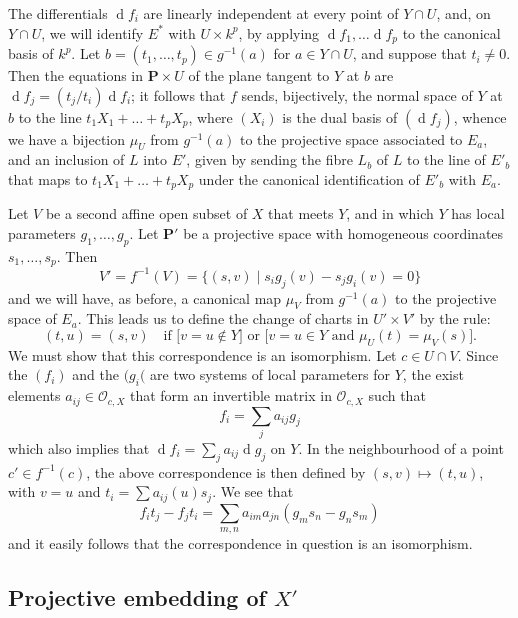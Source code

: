 \documentclass{article}
\theoremstyle{plain}
\theoremstyle{definition}
\newcommand{\scr}[1]{{\mathscr{#1}}}
\newcommand{\PP}{\mathbf{P}}
\newcommand{\dd}{\operatorname{d}\!}
\newcommand{\oldpage}[1]{\marginpar{\footnotesize$\Big\vert$ \textit{p.~#1}}}
\begin{document}
The differentials $\dd f_i$ are linearly independent at every point of $Y\cap U$, and, on $Y\cap U$, we will identify $E^*$ with $U\times k^p$, by applying $\dd f_1,\ldots\dd f_p$ to the canonical basis of $k^p$.
Let $b=(t_1,\ldots,t_p)\in g^{-1}(a)$ for $a\in Y\cap U$, and suppose that $t_i\neq 0$.
Then the equations in $\PP\times U$ of the plane tangent to $Y$ at $b$ are $\dd f_j=(t_j/t_i)\dd f_i$;
it follows that $f$ sends, bijectively, the normal space of $Y$ at $b$ to the line $t_1X_1+\ldots+t_pX_p$, where $(X_i)$ is the dual basis of $(\dd f_j)$, whence we have a bijection $\mu_U$ from $g^{-1}(a)$ to the projective space associated to $E_a$, and an inclusion of $L$ into $E'$, given by sending the fibre $L_b$ of $L$ to the line of $E'_b$ that maps to $t_1X_1+\ldots+t_pX_p$ under the canonical identification of $E'_b$ with $E_a$.

Let $V$ be a second affine open subset of $X$ that meets $Y$, and in which $Y$ has local parameters $g_1,\ldots,g_p$.
Let $\PP'$ be a projective space with homogeneous coordinates $s_1,\ldots,s_p$.
Then
\[
  V' = f^{-1}(V) = \big\{(s,v) \mid s_ig_j(v)-s_jg_i(v)=0\big\}
\]
and we will have, as before, a canonical map $\mu_V$ from $g^{-1}(a)$ to the projective space of $E_a$.
This leads us to define the change of charts in $U'\times V'$ by the rule:
\[
  (t,u) = (s,v)
  \quad\mbox{if [$v=u\not\in Y$] or [$v=u\in Y$ and $\mu_U(t)=\mu_V(s)$].}
\]
We must show that this correspondence is an isomorphism.
Let $c\in U\cap V$.
Since the $(f_i)$ and the $(g_i($ are two systems of local parameters for $Y$, the exist elements $a_{ij}\in\scr{O}_{c,X}$ that form an invertible matrix in $\scr{O}_{c,X}$
\oldpage{127}
such that
\[
  f_i = \sum_j a_{ij}g_j
\]
which also implies that $\dd f_i = \sum_j a_{ij}\dd g_j$ on $Y$.
In the neighbourhood of a point $c'\in f^{-1}(c)$, the above correspondence is then defined by $(s,v)\mapsto(t,u)$, with $v=u$ and $t_i=\sum a_{ij}(u)s_j$.
We see that
\[
  f_it_j-f_jt_i = \sum_{m,n} a_{im}a_{jn}(g_ms_n-g_ns_m)
\]
and it easily follows that the correspondence in question is an isomorphism.


\subsection{Projective embedding of \texorpdfstring{$X'$}{X'}}
\label{subsection12c}
\end{document}
